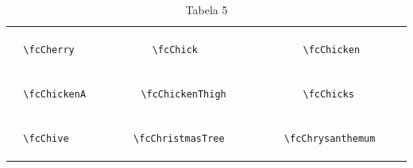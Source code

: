 \documentclass[x11names]{article}
\begin{document}
\begin{table}[H]
\begin{tabular}{|c|c|c|c|c|c|}
		&\multirow{5}{*}{	\fcCherry	[scale=0.64]} & &\multirow{5}{*}{	\fcChick	[scale=0.16]} & &\multirow{5}{*}{	\fcChicken	[scale=0.16]}\\	& & & & & \\	& & & & & \\	\verb|	\fcCherry	| & & \verb|	\fcChick	| & & \verb|	\fcChicken	| & \\	& & & & & \\	& & & & & \\	& & & & & \\	\hline									
		&\multirow{5}{*}{	\fcChickenA	[scale=0.16]} & &\multirow{5}{*}{	\fcChickenThigh	[scale=0.09]} & &\multirow{5}{*}{	\fcChicks	[scale=0.09]}\\	& & & & & \\	& & & & & \\	\verb|	\fcChickenA	| & & \verb|	\fcChickenThigh	| & & \verb|	\fcChicks	| & \\	& & & & & \\	& & & & & \\	& & & & & \\	\hline									
		&\multirow{5}{*}{	\fcChive	[scale=0.16]} & &\multirow{5}{*}{	\fcChristmasTree	[scale=0.64]} & &\multirow{5}{*}{	\fcChrysanthemum	[scale=0.16]}\\	& & & & & \\	& & & & & \\	\verb|	\fcChive	| & & \verb|	\fcChristmasTree	| & & \verb|	\fcChrysanthemum	| & \\	& & & & & \\	& & & & & \\	& & & & & \\		\hline 	\hline 	\end{tabular}	\caption{	Tabela 5	}\label{	Tab5	}\end{table}
\end{document}

